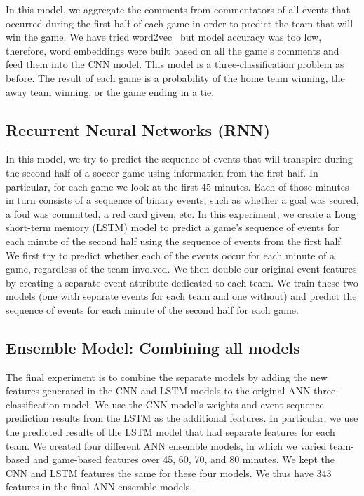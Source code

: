 \documentclass[11pt,a4paper]{article}
\begin{document}
In this model, we aggregate the comments from commentators of all events that occurred during the first half of each game in order to predict the team that will win the game. We have tried word2vec~\cite{mikolov2013efficient} but model accuracy was too low, therefore, word embeddings were built based on all the game’s comments and feed them into the CNN model. This model is a three-classification problem as before. The result of each game is a probability of the home team winning, the away team winning, or the game ending in a tie.

\subsection{Recurrent Neural Networks (RNN)}

In this model, we try to predict the sequence of events that will transpire during the second half of a soccer game using information from the first half. In particular, for each game we look at the first 45 minutes. Each of those minutes in turn consists of a sequence of binary events, such as whether a goal was scored, a foul was committed, a red card given, etc. In this experiment, we create a Long short-term memory (LSTM) model to predict a game’s sequence of events for each minute of the second half using the sequence of events from the first half. We first try to predict whether each of the events occur for each minute of a game, regardless of the team involved. We then double our original event features by creating a separate event attribute dedicated to each team. We train these two models (one with separate events for each team and one without) and predict the sequence of events for each minute of the second half for each game.

\subsection{Ensemble Model: Combining all models}

The final experiment is to combine the separate models by adding the new features generated in the CNN and LSTM models to the original ANN three-classification model. We use the CNN model’s weights and event sequence prediction results from the LSTM as the additional features. In particular, we use the predicted results of the LSTM model that had separate features for each team. We created four different ANN ensemble models, in which we varied team-based and game-based features over 45, 60, 70, and 80 minutes. We kept the CNN and LSTM features the same for these four models. We thus have 343 features in the final ANN ensemble models.
\end{document}
